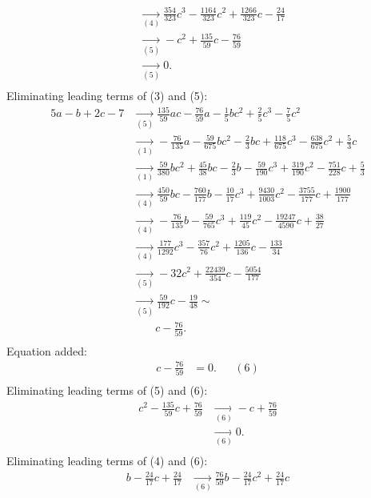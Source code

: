 {\begin{align*}
\\ &\underset{(4)}{\rightarrow}\frac{354}{323}c^{3}-\frac{1164}{323}c^{2}+\frac{1266}{323}c-\frac{24}{17}
\\ &\underset{(5)}{\rightarrow}-c^{2}+\frac{135}{59}c-\frac{76}{59}
\\ &\underset{(5)}{\rightarrow}0
.\\ \end{align*}
Eliminating leading terms of (3) and (5):
\begin{align*}
5a-b+2c-7&\underset{(5)}{\rightarrow}\frac{135}{59}ac-\frac{76}{59}a-\frac{1}{5}bc^{2}+\frac{2}{5}c^{3}-\frac{7}{5}c^{2}
\\ &\underset{(1)}{\rightarrow}-\frac{76}{135}a-\frac{59}{675}bc^{2}-\frac{2}{3}bc+\frac{118}{675}c^{3}-\frac{638}{675}c^{2}+\frac{5}{3}c
\\ &\underset{(1)}{\rightarrow}\frac{59}{380}bc^{2}+\frac{45}{38}bc-\frac{2}{3}b-\frac{59}{190}c^{3}+\frac{319}{190}c^{2}-\frac{751}{228}c+\frac{5}{3}
\\ &\underset{(4)}{\rightarrow}\frac{450}{59}bc-\frac{760}{177}b-\frac{10}{17}c^{3}+\frac{9430}{1003}c^{2}-\frac{3755}{177}c+\frac{1900}{177}
\\ &\underset{(4)}{\rightarrow}-\frac{76}{135}b-\frac{59}{765}c^{3}+\frac{119}{45}c^{2}-\frac{19247}{4590}c+\frac{38}{27}
\\ &\underset{(4)}{\rightarrow}\frac{177}{1292}c^{3}-\frac{357}{76}c^{2}+\frac{1205}{136}c-\frac{133}{34}
\\ &\underset{(5)}{\rightarrow}-32c^{2}+\frac{22439}{354}c-\frac{5054}{177}
\\ &\underset{(5)}{\rightarrow}\frac{59}{192}c-\frac{19}{48}
\sim \\ &\qquad c-\frac{76}{59}
.\\ \end{align*}
Equation added:
\begin{align*}
c-\frac{76}{59}&= 0. &&(6)\\
\end{align*}
Eliminating leading terms of (5) and (6):
\begin{align*}
c^{2}-\frac{135}{59}c+\frac{76}{59}&\underset{(6)}{\rightarrow}-c+\frac{76}{59}
\\ &\underset{(6)}{\rightarrow}0
.\\ \end{align*}
Eliminating leading terms of (4) and (6):
\begin{align*}
b-\frac{24}{17}c+\frac{24}{17}&\underset{(6)}{\rightarrow}\frac{76}{59}b-\frac{24}{17}c^{2}+\frac{24}{17}c

\end{align*}}
